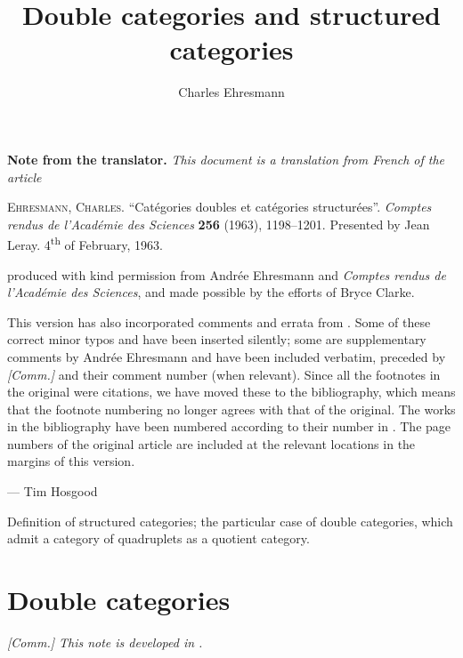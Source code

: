 \documentclass{article}
\title{Double categories and structured categories}
\author{Charles Ehresmann}
\date{}
\newcommand{\origcit}{%
  \textsc{Ehresmann, Charles.}
  ``Catégories doubles et catégories structurées''.
  \emph{Comptes rendus de l'Académie des Sciences} \textbf{256} (1963), 1198--1201.
  Presented by Jean Leray.
  4\textsuperscript{th} of February, 1963.
}
\renewenvironment{abstract}{%
  \quotation
  \normalsize
  \begin{center}\textbf{{\abstractname}}\end{center}
  \par\smallskip\noindent
}{\endquotation}
\newenvironment{translator}[1]
  {\phantomsection\par\medskip\noindent\small\textbf{#1.}\itshape}
  {\par\medskip}
\newcommand{\oldpage}[1]{\marginpar{\footnotesize$\Big\vert$ \textit{p.~#1}}}
\begin{document}
\maketitle

\begin{translator}{Note from the translator}
  This document is a translation from French of the article

  \medskip
  {\normalfont\origcit}

  \medskip
  {\noindent}produced with kind permission from Andrée Ehresmann and \emph{Comptes rendus de l'Académie des Sciences}, and made possible by the efforts of Bryce Clarke.

  This version has also incorporated comments and errata from \cite[Comments on Part III-1, p.~339]{coll}.
  Some of these correct minor typos and have been inserted silently; some are supplementary comments by Andrée Ehresmann and have been included verbatim, preceded by \emph{[Comm.]} and their comment number (when relevant).
  Since all the footnotes in the original were citations, we have moved these to the bibliography, which means that the footnote numbering no longer agrees with that of the original.
  The works in the bibliography have been numbered according to their number in \cite{coll}.
  The page numbers of the original article are included at the relevant locations in the margins of this version.
  
  \hfill--- Tim Hosgood
\end{translator}




\begin{abstract}Definition of structured categories; the particular case of double categories, which admit a category of quadruplets as a quotient category.\end{abstract}

\section{Double categories}
\oldpage{1198}

\emph{[Comm.] This note is developed in \cite{63}.}
\end{document}
